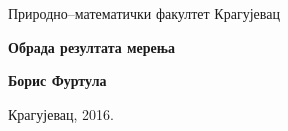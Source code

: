 \documentclass[a4paper,twoside,openany]{book}
\begin{document}
\frontmatter
{}
\baselineskip=0.30in
\allowdisplaybreaks

\begin{center}

\begin{sffamily}

{\large Природно--математички факултет Крагујевац}

\thispagestyle{empty}


\vspace*{7cm}
{\mdseries
{\HUGE\textbf{Обрада резултата мерења}}}

\vspace*{2cm}

{\Large\textbf{Борис Фуртула}}

\vfill

{\large Крагујевац, 2016.}
\end{sffamily}
\end{center}
\newpage


\baselineskip=0.22in

\tableofcontents

\baselineskip=0.28in

\newpage
\setcounter{chapter}{0}

\mainmatter





\end{document}
